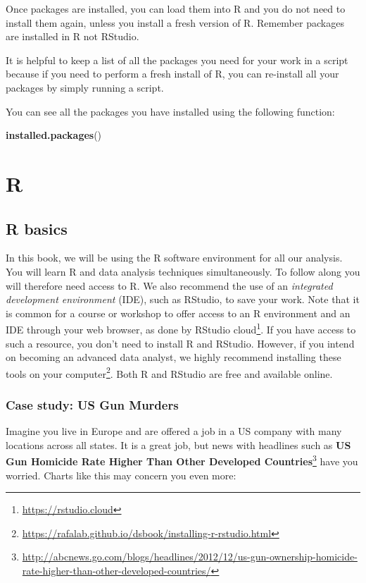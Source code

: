 \documentclass[
]{krantz}
\newenvironment{Shaded}{\begin{snugshade}}{\end{snugshade}}
\newcommand{\KeywordTok}[1]{\textcolor[rgb]{0.27,0.27,0.27}{\textbf{#1}}}
\newcommand{\NormalTok}[1]{#1}
\begin{document}
Once packages are installed, you can load them into R and you do not need to install them again, unless you install a fresh version of R. Remember packages are installed in R not RStudio.

It is helpful to keep a list of all the packages you need for your work in a script because if you need to perform a fresh install of R, you can re-install all your packages by simply running a script.

You can see all the packages you have installed using the following function:

\begin{Shaded}
\begin{Highlighting}[]
\KeywordTok{installed.packages}\NormalTok{()}
\end{Highlighting}
\end{Shaded}

\hypertarget{part-r}{%
\part{R}\label{part-r}}

\hypertarget{r-basics}{%
\chapter{R basics}\label{r-basics}}

In this book, we will be using the R software environment for all our
analysis. You will learn R and data analysis techniques simultaneously. To follow along you will therefore need access to R. We also recommend the use of an \emph{integrated development environment} (IDE), such as RStudio, to save your work.
Note that it is common for a course or workshop to offer access to an R environment and an IDE through your web browser, as done by RStudio cloud\footnote{\url{https://rstudio.cloud}}. If you have access to such a resource, you don't need to install R and RStudio. However, if you intend on becoming an advanced data analyst, we highly recommend installing these tools on your computer\footnote{\url{https://rafalab.github.io/dsbook/installing-r-rstudio.html}}.
Both R and RStudio are free and available online.

\hypertarget{case-study-us-gun-murders}{%
\section{Case study: US Gun Murders}\label{case-study-us-gun-murders}}

Imagine you live in Europe and are offered a job in a US company with many locations across all states. It is a great job, but news with headlines such as \textbf{US Gun Homicide Rate Higher Than Other Developed Countries}\footnote{\url{http://abcnews.go.com/blogs/headlines/2012/12/us-gun-ownership-homicide-rate-higher-than-other-developed-countries/}} have you worried. Charts like this may concern you even more:
\end{document}
